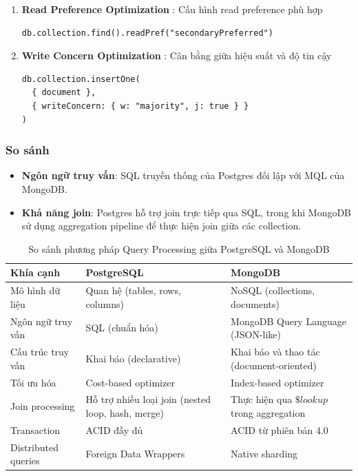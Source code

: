 \begin{enumerate}
    \item \textbf{Read Preference Optimization} : Cấu hình read preference phù hợp
\begin{lstlisting}[style=mongodb, caption=Ví dụ Read Preference Optimization trong MongoDB, label=mongodb:example]
db.collection.find().readPref("secondaryPreferred")
\end{lstlisting}

     \item \textbf{Write Concern Optimization} : Cân bằng giữa hiệu suất và độ tin cậy
\begin{lstlisting}[style=mongodb, caption=Ví dụ Write Concern Optimization trong MongoDB, label=mongodb:example]
db.collection.insertOne(
  { document },
  { writeConcern: { w: "majority", j: true } }
)
\end{lstlisting}
\end{enumerate}




\subsubsection{So sánh}

\begin{itemize}
    \item \textbf{Ngôn ngữ truy vấn}: SQL truyền thống của Postgres đối lập với MQL của MongoDB.
    \item \textbf{Khả năng join}: Postgres hỗ trợ join trực tiếp qua SQL, trong khi MongoDB sử dụng aggregation pipeline để thực hiện join giữa các collection.
\end{itemize}

\begin{table}[H]
    \centering
    \begin{tabular}{|l|l|l|}
        \hline
        \textbf{Khía cạnh} & \textbf{PostgreSQL} & \textbf{MongoDB} \\ \hline
        Mô hình dữ liệu & Quan hệ (tables, rows, columns) & NoSQL (collections, documents) \\ \hline
        Ngôn ngữ truy vấn & SQL (chuẩn hóa) & MongoDB Query Language (JSON-like) \\ \hline
        Cấu trúc truy vấn & Khai báo (declarative) & Khai báo và thao tác (document-oriented) \\ \hline
        Tối ưu hóa & Cost-based optimizer & Index-based optimizer \\ \hline
        Join processing & Hỗ trợ nhiều loại join (nested loop, hash, merge) & Thực hiện qua $ \$lookup $ trong aggregation \\ \hline
        Transaction & ACID đầy đủ & ACID từ phiên bản 4.0 \\ \hline
        Distributed queries & Foreign Data Wrappers & Native sharding \\ \hline
    \end{tabular}
    \caption{So sánh phương pháp Query Processing giữa PostgreSQL và MongoDB}
    \label{tab:comparison_postgresql_mongodb}
\end{table}

